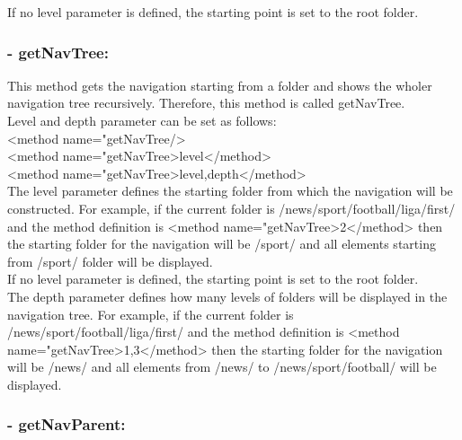   If no level parameter is defined, the starting point is set to the 
root folder. \\

\subsubsection{- getNavTree:} 

  This method gets the navigation starting from a folder and shows 
the wholer navigation tree recursively. Therefore, this method is 
called {\name getNavTree}. \\

  Level and depth parameter can be set as follows: \\
  {\tag <method name="getNavTree/>} \\
  {\tag <method name="getNavTree>level</method>} \\
  {\tag <method name="getNavTree>level,depth</method>} \\

  The level parameter defines the starting folder from which the 
navigation will be constructed. For example, if the current folder is 
{\dir /news/sport/foot\-ball/li\-ga/first/} and the method definition is 
{\tag <method name="getNavTree>2</method>} then the starting folder for the 
navigation will be {\dir /sport/} and all elements starting from 
{\dir /sport/} folder will be displayed. \\

  If no level parameter is defined, the starting point is set to the 
root folder. \\

  The depth parameter defines how many levels of folders will be displayed 
in the navigation tree. For example, if the current folder is 
{\dir /news/sport/football/liga/first/} and the method definition is 
{\tag <method name="getNavTree>1,3</method>} then the starting folder for 
the navigation will be {\dir /news/} and all elements from {\dir /news/} 
to {\dir /news/sport/football/} will be displayed. \\

\subsubsection{- getNavParent:} 

